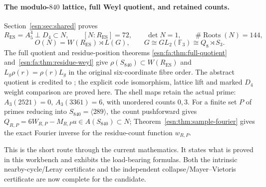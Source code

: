 \paragraph{The modulo-$840$ lattice, full Weyl quotient, and retained counts.}
Section~\ref{esn:sec:shared} proves
\[
 R_{\mathrm{ES}}=A_5^4\perp D_4\subset N,\qquad
 [N:R_{\mathrm{ES}}]=72,\qquad \det N=1,\qquad
 \#\operatorname{Roots}(N)=144,
\]
\[
 O(N)=W(R_{\mathrm{ES}})\rtimes L(G),\qquad
 G\cong GL_2(\mathbb F_3)\cong Q_8\rtimes S_3.
\]
The full quotient and residue-position theorems
\ref{esn:fa:thm:full-quotient} and~\ref{esn:fa:thm:residue-weyl}
give $\rho(S_{840})\subset W(R_{\mathrm{ES}})$ and
$L_g\rho(r)=\rho(r)L_g$ in the original six-coordinate fibre order.
The abstract quotient is credited to \cite[Table~3]{esn:CDH2014};
the explicit code isomorphism, lattice lift and marked $D_4$ weight
comparison are proved here. The shell maps retain the actual prime:
$A_3(2521)=0$, $A_3(3361)=6$, with unordered counts $0,3$.
For a finite set $P$ of primes reducing into $S_{840}=\langle289\rangle$,
the count pushforward gives
$Q_{R,P}=6W_{R,P}-M_{R,P}u\in A(S_{840})\subset N$;
Theorem~\ref{esn:thm:sample-fourier} gives the exact Fourier inverse
for the residue-count function $w_{R,P}$.

This is the short route through the current mathematics.  It states what is
proved in this workbench and exhibits the load-bearing formulas.  Both the
intrinsic nearby-cycle/Leray certificate and the independent
collapse/Mayer--Vietoris certificate are now complete for the candidate.


